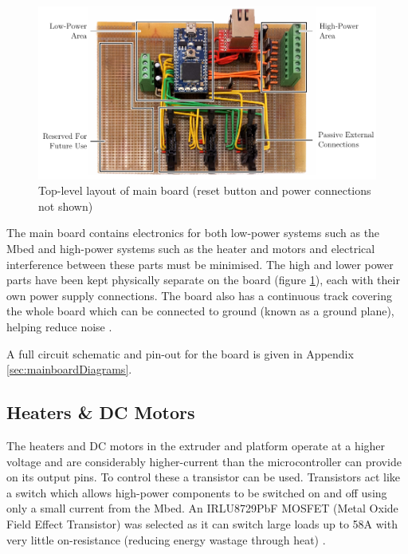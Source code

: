 			\begin{figure}
				\includegraphics[width=1\textwidth]{diagrams/mainBoard.pdf}
				\caption{Top-level layout of main board (reset button and power
				         connections not shown)}
				\label{fig:mainBoard}
			\end{figure}
			
			The main board contains electronics for both low-power systems such as the
			Mbed and high-power systems such as the heater and motors and electrical
			interference between these parts must be minimised. The high and lower
			power parts have been kept physically separate on the board (figure
			\ref{fig:mainBoard}), each with their own power supply connections. The
			board also has a continuous track covering the whole board which can be
			connected to ground (known as a ground plane), helping reduce
			noise \cite{pcb_design_notes}.
			
			A full circuit schematic and pin-out for the board is given in Appendix
			\ref{sec:mainboardDiagrams}.
		
		\subsection{Heaters \& DC Motors}
			
			\label{sec:heatersAndMotors}
			
			The heaters and DC motors in the extruder and platform operate at a higher
			voltage and are considerably higher-current than the microcontroller can
			provide on its output pins. To control these a transistor can be used.
			Transistors act like a switch which allows high-power components to be
			switched on and off using only a small current from the Mbed. An
			IRLU8729PbF MOSFET (Metal Oxide Field Effect Transistor) was selected as
			it can switch large loads up to 58A with very little on-resistance
			(reducing energy wastage through heat) \cite{MOSFET}.
			
